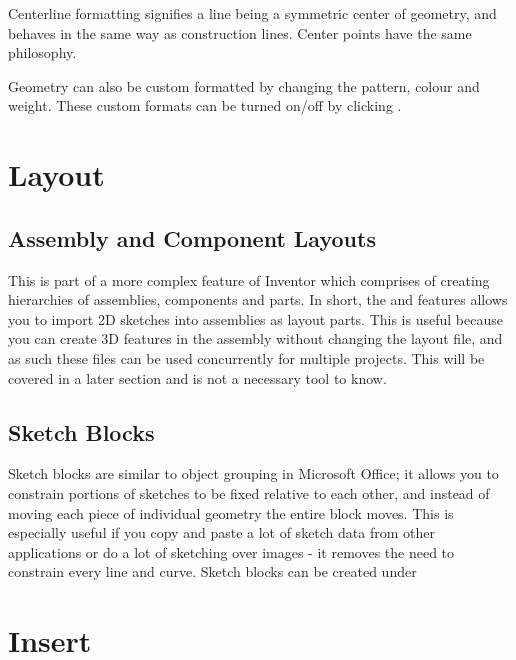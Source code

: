 \begin{enumerate}
Centerline formatting signifies a line being a symmetric center of geometry, and behaves in the same way as construction lines. Center points have the same philosophy.

Geometry can also be custom formatted by changing the pattern, colour and weight. These custom formats can be turned on/off by clicking .

\cbend
\section{Layout}

\subsection{Assembly and Component Layouts}
\cbstart
{}

This is part of a more complex feature of Inventor which comprises of creating hierarchies of assemblies, components and parts. In short, the  and \newline {} features allows you to import 2D sketches into assemblies as layout parts. This is useful because you can create 3D features in the assembly without changing the layout file, and as such these files can be used concurrently for multiple projects. This will be covered in a later section and is not a necessary tool to know.

\cbend

\subsection{Sketch Blocks}

\cbstart
{}
Sketch blocks are similar to object grouping in Microsoft Office; it allows you to constrain portions of sketches to be fixed relative to each other, and instead of moving each piece of individual geometry the entire block moves. This is especially useful if you copy and paste a lot of sketch data from other applications or do a lot of sketching over images - it removes the need to constrain every line and curve. Sketch blocks can be created under 

\cbend

\section{Insert}


\end{enumerate}
